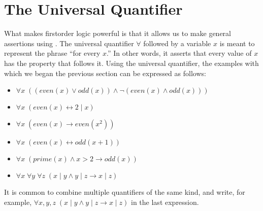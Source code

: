 \documentclass[letterpaper,10pt,english]{sphinxmanual}
\begin{document}
\section{The Universal Quantifier}
\label{\detokenize{first_order_logic:the-universal-quantifier}}
\sphinxAtStartPar
What makes first\sphinxhyphen{}order logic powerful is that it allows us to make general assertions using . The universal quantifier \(\forall\) followed by a variable \(x\) is meant to represent the phrase “for every \(x\).” In other words, it asserts that every value of \(x\) has the property that follows it. Using the universal quantifier, the examples with which we began the previous section can be expressed as follows:
\begin{itemize}
\item {} 
\sphinxAtStartPar
\(\forall x \; ((\mathit{even}(x) \vee \mathit{odd}(x)) \wedge \neg (\mathit{even}(x) \wedge \mathit{odd}(x)))\)

\item {} 
\sphinxAtStartPar
\(\forall x \; (\mathit{even}(x) \leftrightarrow 2 \mid x)\)

\item {} 
\sphinxAtStartPar
\(\forall x \; (\mathit{even}(x) \to \mathit{even}(x^2))\)

\item {} 
\sphinxAtStartPar
\(\forall x \; (\mathit{even}(x) \leftrightarrow \mathit{odd}(x+1))\)

\item {} 
\sphinxAtStartPar
\(\forall x \; (\mathit{prime}(x) \wedge x > 2 \to \mathit{odd}(x))\)

\item {} 
\sphinxAtStartPar
\(\forall x \; \forall y \; \forall z \; (x \mid y \wedge y \mid z \to x \mid z)\)

\end{itemize}

\sphinxAtStartPar
It is common to combine multiple quantifiers of the same kind, and write, for example, \(\forall x, y, z \; (x \mid y \wedge y \mid z \to x \mid z)\) in the last expression.
\end{document}
